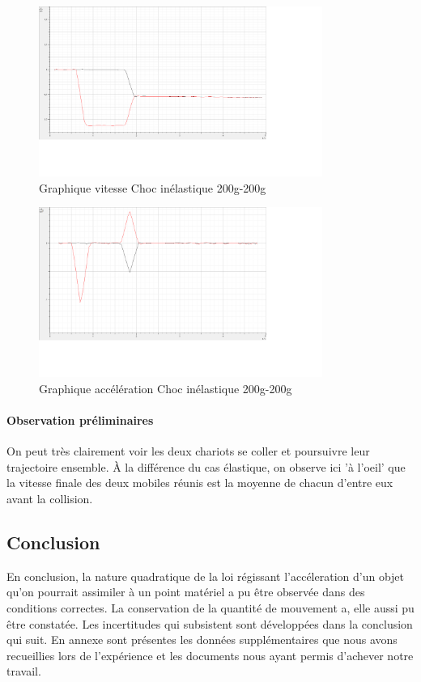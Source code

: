 \begin{figure}[h]
    \caption[Graphique vitesse Choc inélastique 200g-200g]{Graphique vitesse Choc inélastique 200g-200g}
    \centering
    \includegraphics[height=15em]{Data/200-200inela02v.png}
\end{figure}

\begin{figure}[h]
    \caption[Graphique accélération Choc inélastique 200g-200g]{Graphique accélération Choc inélastique 200g-200g}
    \centering
    \includegraphics[height=15em]{Data/200-200inela02a.png}
\end{figure}

\paragraph{Observation préliminaires}
On peut très clairement voir les deux chariots se coller et poursuivre leur trajectoire ensemble.
À la différence du cas élastique, on observe ici 'à l'oeil' que la vitesse finale des deux mobiles réunis est la moyenne de chacun d'entre eux avant la collision.

\subsection{Conclusion}
En conclusion, la nature quadratique de la loi régissant l'accéleration d'un objet qu'on pourrait assimiler à un point matériel a pu être observée dans des conditions correctes.
La conservation de la quantité de mouvement a, elle aussi pu être constatée. Les incertitudes qui subsistent sont développées dans la conclusion qui suit.
En annexe sont présentes les données supplémentaires que nous avons recueillies lors de l'expérience et les documents nous ayant permis d'achever notre travail.
